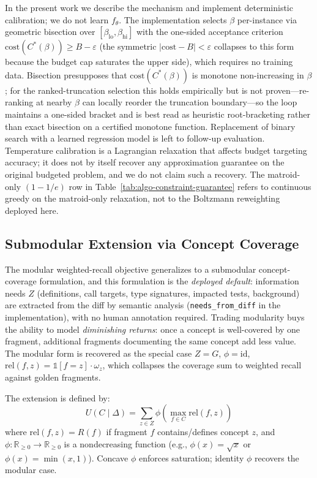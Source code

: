 \documentclass[11pt, a4paper]{article}
\providecommand{\mathbbm}[1]{\mathds{#1}}
\begin{document}
In the present work we describe the mechanism and implement deterministic calibration; we do not learn $f_\theta$. The implementation selects $\beta$ per-instance via geometric bisection over $[\beta_{\mathrm{lo}}, \beta_{\mathrm{hi}}]$ with the one-sided acceptance criterion $\mathrm{cost}(C^*(\beta)) \geq B - \varepsilon$ (the symmetric $|\mathrm{cost} - B| < \varepsilon$ collapses to this form because the budget cap saturates the upper side), which requires no training data. Bisection presupposes that $\mathrm{cost}(C^*(\beta))$ is monotone non-increasing in $\beta$; for the ranked-truncation selection this holds empirically but is not proven---re-ranking at nearby $\beta$ can locally reorder the truncation boundary---so the loop maintains a one-sided bracket and is best read as heuristic root-bracketing rather than exact bisection on a certified monotone function. Replacement of binary search with a learned regression model is left to follow-up evaluation. Temperature calibration is a Lagrangian relaxation that affects budget targeting accuracy; it does not by itself recover any approximation guarantee on the original budgeted problem, and we do not claim such a recovery. The matroid-only $(1-1/e)$ row in Table~\ref{tab:algo-constraint-guarantee} refers to continuous greedy on the matroid-only relaxation, not to the Boltzmann reweighting deployed here.

\subsection{Submodular Extension via Concept Coverage}
\label{sec:utility}

The modular weighted-recall objective generalizes to a submodular concept-coverage formulation, and this formulation is the \emph{deployed default}: information needs $Z$ (definitions, call targets, type signatures, impacted tests, background) are extracted from the diff by semantic analysis (\texttt{needs\_from\_diff} in the implementation), with no human annotation required. Trading modularity buys the ability to model \emph{diminishing returns}: once a concept is well-covered by one fragment, additional fragments documenting the same concept add less value. The modular form is recovered as the special case $Z = G$, $\phi = \mathrm{id}$, $\mathrm{rel}(f, z) = \mathbbm{1}[f = z] \cdot \omega_z$, which collapses the coverage sum to weighted recall against golden fragments.

The extension is defined by:
\begin{equation}
    U(C \mid \Delta) = \sum_{z \in Z} \phi\left(\max_{f \in C} \text{rel}(f, z)\right)
\end{equation}
where $\text{rel}(f, z) = R(f)$ if fragment $f$ contains/defines concept $z$, and $\phi: \mathbb{R}_{\geq 0} \to \mathbb{R}_{\geq 0}$ is a nondecreasing function (e.g., $\phi(x) = \sqrt{x}$ or $\phi(x) = \min(x, 1)$). Concave $\phi$ enforces saturation; identity $\phi$ recovers the modular case.
\end{document}
